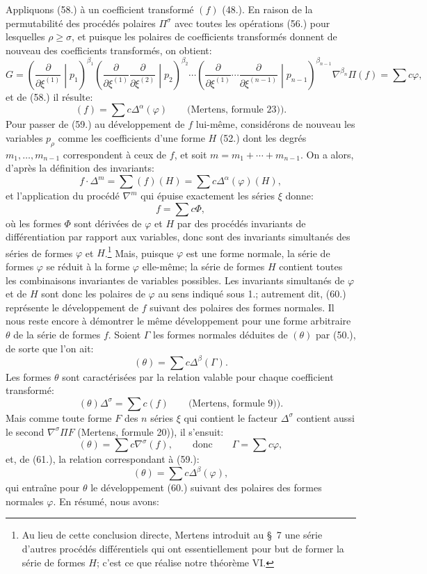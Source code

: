 \documentclass[11pt]{article}
\begin{document}
Appliquons (58.) à un coefficient transformé $(f)$ (48.). En raison de la permutabilité des procédés polaires $\Pi^\sigma$ avec toutes les opérations (56.) pour lesquelles $\rho\ge\sigma$, et puisque les polaires de coefficients transformés donnent de nouveau des coefficients transformés, on obtient:
\[
 G=\left(\frac{\partial}{\partial\xi^{(1)}}\middle|p_1\right)^{\beta_1}
 \left(\frac{\partial}{\partial\xi^{(1)}}\frac{\partial}{\partial\xi^{(2)}}\middle|p_2\right)^{\beta_2}
 \cdots
 \left(\frac{\partial}{\partial\xi^{(1)}}\cdots\frac{\partial}{\partial\xi^{(n-1)}}\middle|p_{n-1}\right)^{\beta_{n-1}}
 \nabla^{\beta_n}\Pi(f)=\sum c\varphi,
\]
et de (58.) il résulte:
\begin{equation}
 (f)=\sum c\Delta^\alpha(\varphi)\qquad\text{(Mertens, formule 23)).}
\tag{59}
\end{equation}
Pour passer de (59.) au développement de $f$ lui-même, considérons de nouveau les variables $p_\rho$ comme les coefficients d'une forme $H$ (52.) dont les degrés $m_1,\ldots,m_{n-1}$ correspondent à ceux de $f$, et soit $m=m_1+\cdots+m_{n-1}$. On a alors, d'après la définition des invariants:
\[
 f\cdot\Delta^m=\sum(f)(H)=\sum c\Delta^\alpha(\varphi)(H),
\]
et l'application du procédé $\nabla^m$ qui épuise exactement les séries $\xi$ donne:
\begin{equation}
 f=\sum c\Phi,
\tag{60}
\end{equation}
où les formes $\Phi$ sont dérivées de $\varphi$ et $H$ par des procédés invariants de différentiation par rapport aux variables, donc sont des invariants simultanés des séries de formes $\varphi$ et $H$.\footnote{Au lieu de cette conclusion directe, Mertens introduit au \S\ 7 une série d'autres procédés différentiels qui ont essentiellement pour but de former la série de formes $H$; c'est ce que réalise notre théorème VI.} Mais, puisque $\varphi$ est une forme normale, la série de formes $\varphi$ se réduit à la forme $\varphi$ elle-même; la série de formes $H$ contient toutes les combinaisons invariantes de variables possibles. Les invariants simultanés de $\varphi$ et de $H$ sont donc les polaires de $\varphi$ au sens indiqué sous 1.; autrement dit, (60.) représente le développement de $f$ suivant des polaires des formes normales. Il nous reste encore à démontrer le même développement pour une forme arbitraire $\theta$ de la série de formes $f$. Soient $\Gamma$ les formes normales déduites de $(\theta)$ par (50.), de sorte que l'on ait:
\begin{equation}
 (\theta)=\sum c\Delta^\beta(\Gamma).
\tag{61}
\end{equation}
Les formes $\theta$ sont caractérisées par la relation valable pour chaque coefficient transformé:
\[
 (\theta)\Delta^\sigma=\sum c(f)\qquad\text{(Mertens, formule 9)).}
\]
Mais comme toute forme $F$ des $n$ séries $\xi$ qui contient le facteur $\Delta^\sigma$ contient aussi le second $\nabla^\sigma\Pi F$ (Mertens, formule 20)), il s'ensuit:
\[
 (\theta)=\sum c\nabla^\sigma(f),\qquad\text{donc}\qquad \Gamma=\sum c\varphi,
\]
et, de (61.), la relation correspondant à (59.):
\[
 (\theta)=\sum c\Delta^\beta(\varphi),
\]
qui entraîne pour $\theta$ le développement (60.) suivant des polaires des formes normales $\varphi$. En résumé, nous avons:
\end{document}
